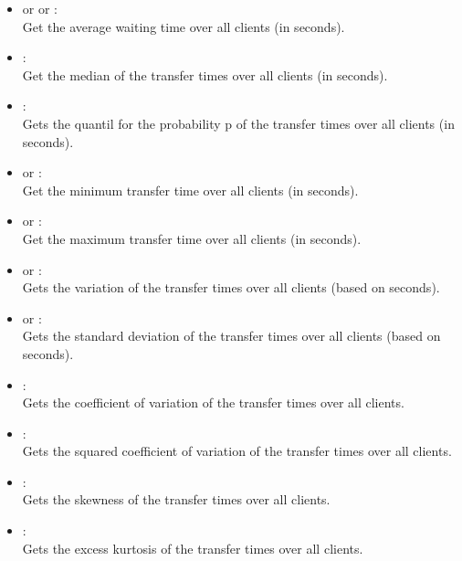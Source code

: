 \begin{itemize}

\item
{} or  or :\\
Get the average waiting time over all clients (in seconds).

\item
{}:\\
Get the median of the transfer times over all clients (in seconds).

\item
{}:\\
Gets the quantil for the probability p of the transfer times over all clients (in seconds).

\item
{} or :\\
Get the minimum transfer time over all clients (in seconds).

\item
{} or :\\
Get the maximum transfer time over all clients (in seconds).

\item
{} or :\\
Gets the variation of the transfer times over all clients (based on seconds).

\item
{} or :\\
Gets the standard deviation of the transfer times over all clients (based on seconds).

\item
{}:\\
Gets the coefficient of variation of the transfer times over all clients.

\item
{}:\\
Gets the squared coefficient of variation of the transfer times over all clients.

\item
{}:\\
Gets the skewness of the transfer times over all clients.

\item
{}:\\
Gets the excess kurtosis of the transfer times over all clients.


\end{itemize}
